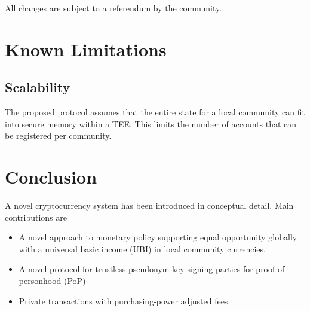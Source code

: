 \documentclass[conference]{IEEEtran}
\begin{document}
All changes are subject to a referendum by the community.

\section{Known Limitations}
\subsection{Scalability}
The proposed \encointer protocol assumes that the entire state for a local community can fit into secure memory within a TEE. This limits the number of accounts that can be registered per community. 

\section{Conclusion}
A novel cryptocurrency system has been introduced in conceptual detail. Main contributions are 
\begin{itemize}
	\item A novel approach to monetary policy supporting equal opportunity globally with a  universal basic income (UBI) in local community currencies.
	\item A novel protocol for trustless pseudonym key signing parties for proof-of-personhood (PoP)
	\item Private transactions with purchasing-power adjusted fees.
\end{itemize}
\end{document}
